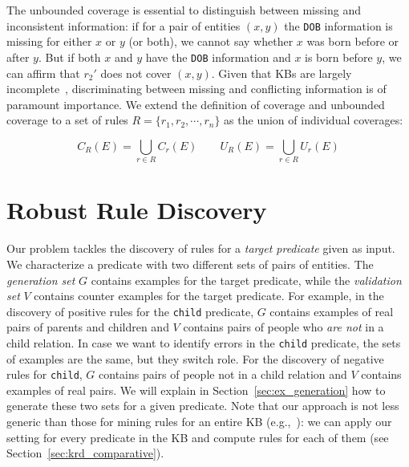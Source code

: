 \vspace{0.5ex}
The unbounded coverage is essential to distinguish between missing and inconsistent information: if for a pair of entities $(x,y)$ the \texttt{DOB} information is missing for either $x$ or $y$ (or both), we cannot say whether $x$ was born before or after $y$. 
But if both $x$ and $y$ have the \texttt{DOB} information and $x$ is born before $y$, we can affirm that $r_2'$ does not cover $(x,y)$. Given that KBs are largely incomplete~\cite{min2013distant}, discriminating between missing and conflicting information is of paramount importance.
%
We extend the definition of coverage and unbounded coverage to a set of rules $R=\{r_1,r_2,\cdots,r_n\}$ as the union of individual coverages:

\vspace{-6mm}	
\begin{equation*}
	C_R(E) = \bigcup \limits_{r \in R} C_r(E) \qquad U_R(E) = \bigcup \limits_{r \in R} U_r(E) 	\end{equation*}
\vspace{-3mm}


\section{Robust Rule Discovery} \label{sec:problem}

Our problem tackles the discovery of %
rules for a {\em target predicate} given as input. We characterize a predicate with two different sets of pairs of entities.
%
The \emph{generation set} $G$ contains examples for the target predicate, 
while the \emph{validation set} $V$ contains counter examples for the target predicate.
For example, in the discovery of positive rules for the {\tt child} predicate, $G$ contains examples of real pairs of parents and children and $V$ contains pairs of people who {\em are not} in a child relation. In case we want to identify errors in the {\tt child} predicate, the sets of examples are the same, but they switch role. For the discovery of negative rules for {\tt child}, $G$ contains pairs of people not in a child relation and $V$ contains examples of real pairs.
We will explain in Section~\ref{sec:ex_generation} how to generate these two sets for a given predicate. Note that our approach is not less generic than those for mining rules for an entire KB (e.g.,~\cite{abedjan2014amending,galarraga2015fast}): 
we can apply our setting for every predicate in the KB and compute rules for each of them (see Section~\ref{sec:krd_comparative}).

